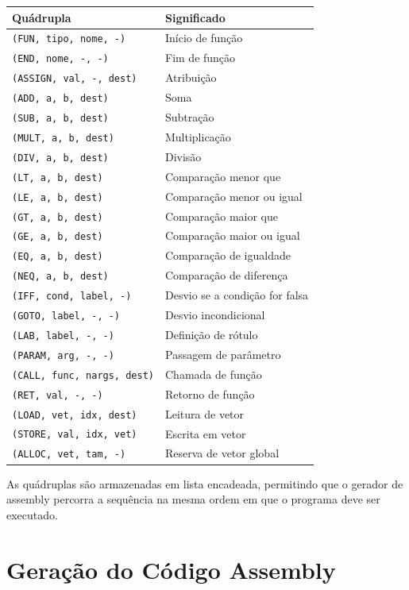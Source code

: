 \documentclass[12pt,a4paper]{report}
\begin{document}
\begin{longtable}{ll}
\toprule
Quádrupla & Significado \\
\midrule
\texttt{(FUN, tipo, nome, -)} & Início de função \\
\texttt{(END, nome, -, -)} & Fim de função \\
\texttt{(ASSIGN, val, -, dest)} & Atribuição \\
\texttt{(ADD, a, b, dest)} & Soma \\
\texttt{(SUB, a, b, dest)} & Subtração \\
\texttt{(MULT, a, b, dest)} & Multiplicação \\
\texttt{(DIV, a, b, dest)} & Divisão \\
\texttt{(LT, a, b, dest)} & Comparação menor que \\
\texttt{(LE, a, b, dest)} & Comparação menor ou igual \\
\texttt{(GT, a, b, dest)} & Comparação maior que \\
\texttt{(GE, a, b, dest)} & Comparação maior ou igual \\
\texttt{(EQ, a, b, dest)} & Comparação de igualdade \\
\texttt{(NEQ, a, b, dest)} & Comparação de diferença \\
\texttt{(IFF, cond, label, -)} & Desvio se a condição for falsa \\
\texttt{(GOTO, label, -, -)} & Desvio incondicional \\
\texttt{(LAB, label, -, -)} & Definição de rótulo \\
\texttt{(PARAM, arg, -, -)} & Passagem de parâmetro \\
\texttt{(CALL, func, nargs, dest)} & Chamada de função \\
\texttt{(RET, val, -, -)} & Retorno de função \\
\texttt{(LOAD, vet, idx, dest)} & Leitura de vetor \\
\texttt{(STORE, val, idx, vet)} & Escrita em vetor \\
\texttt{(ALLOC, vet, tam, -)} & Reserva de vetor global \\
\bottomrule
\end{longtable}

As quádruplas são armazenadas em lista encadeada, permitindo que o gerador de assembly percorra a sequência na mesma ordem em que o programa deve ser executado.

\section{Geração do Código Assembly}
\end{document}
